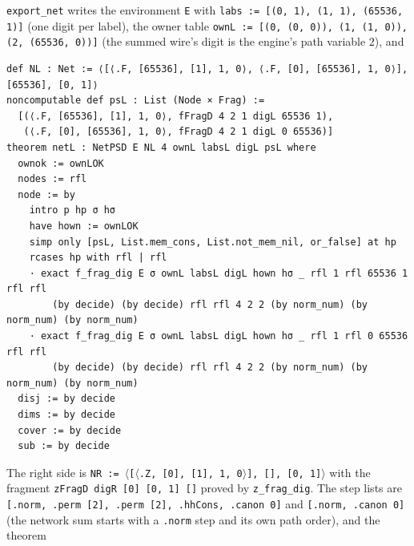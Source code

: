 \begin{example}
\textnormal{\texttt{export\_\allowbreak{}net}} writes the environment \textnormal{\texttt{E}} with \textnormal{\texttt{labs := [(\allowbreak{}0,\allowbreak{} 1),\allowbreak{} (\allowbreak{}1,\allowbreak{} 1),\allowbreak{} (\allowbreak{}65536,\allowbreak{} 1)]}}
(one digit per label), the owner table \textnormal{\texttt{ownL := [(\allowbreak{}0,\allowbreak{} (\allowbreak{}0,\allowbreak{} 0)),\allowbreak{} (\allowbreak{}1,\allowbreak{} (\allowbreak{}1,\allowbreak{} 0)),\allowbreak{} (\allowbreak{}2,\allowbreak{} (\allowbreak{}65536,\allowbreak{} 0))]}}
(the summed wire's digit is the engine's path variable $2$), and
\begin{lstlisting}[style=lean]
def NL : Net := ⟨[⟨.F, [65536], [1], 1, 0⟩, ⟨.F, [0], [65536], 1, 0⟩], [65536], [0, 1]⟩
noncomputable def psL : List (Node × Frag) :=
  [(⟨.F, [65536], [1], 1, 0⟩, fFragD 4 2 1 digL 65536 1),
   (⟨.F, [0], [65536], 1, 0⟩, fFragD 4 2 1 digL 0 65536)]
theorem netL : NetPSD E NL 4 ownL labsL digL psL where
  ownok := ownLOK
  nodes := rfl
  node := by
    intro p hp σ hσ
    have hown := ownLOK
    simp only [psL, List.mem_cons, List.not_mem_nil, or_false] at hp
    rcases hp with rfl | rfl
    · exact f_frag_dig E σ ownL labsL digL hown hσ _ rfl 1 rfl 65536 1 rfl rfl
        (by decide) (by decide) rfl rfl 4 2 2 (by norm_num) (by norm_num) (by norm_num)
    · exact f_frag_dig E σ ownL labsL digL hown hσ _ rfl 1 rfl 0 65536 rfl rfl
        (by decide) (by decide) rfl rfl 4 2 2 (by norm_num) (by norm_num) (by norm_num)
  disj := by decide
  dims := by decide
  cover := by decide
  sub := by decide
\end{lstlisting}
The right side is \textnormal{\texttt{NR := \ensuremath{\langle}[\ensuremath{\langle}.\allowbreak{}Z,\allowbreak{} [0],\allowbreak{} [1],\allowbreak{} 1,\allowbreak{} 0\ensuremath{\rangle}],\allowbreak{} [],\allowbreak{} [0,\allowbreak{} 1]\ensuremath{\rangle}}} with the fragment
\textnormal{\texttt{zFragD digR [0] [0,\allowbreak{} 1] []}} proved by \textnormal{\texttt{z\_\allowbreak{}frag\_\allowbreak{}dig}}. The step lists are
\textnormal{\texttt{[.\allowbreak{}norm,\allowbreak{} .\allowbreak{}perm [2],\allowbreak{} .\allowbreak{}perm [2],\allowbreak{} .\allowbreak{}hhCons,\allowbreak{} .\allowbreak{}canon 0]}} and \textnormal{\texttt{[.\allowbreak{}norm,\allowbreak{} .\allowbreak{}canon 0]}} (the network
sum starts with a \textnormal{\texttt{.\allowbreak{}norm}} step and its own path order), and the theorem
\begin{lstlisting}[style=lean]

\end{lstlisting}
\end{example}
